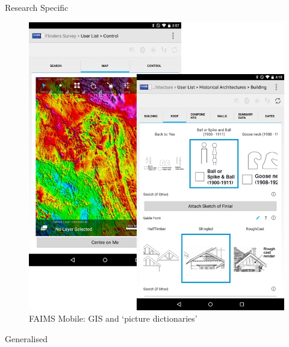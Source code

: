 \documentclass[
	aspectratio=169, %
	12pt, %
	t, %
]{beamer}
\begin{document}
\begin{refsegment}

\begin{frame}{Research Specific}
 \begin{figure}[H]
    \centering
    \vspace{-0.5cm}
        \includegraphics[height=.75\textheight]{figures/FAIMS-screenshots.png}
        \caption{FAIMS Mobile: GIS and `picture dictionaries'}
        \label{fig:FAIMS-mobile-screenshots}
 \end{figure}
\end{frame}



\begin{frame}{Generalised}
 \begin{figure}[H]
    \centering
        \vspace{-0.5cm}


\end{figure}
\end{frame}
\end{refsegment}
\end{document}
